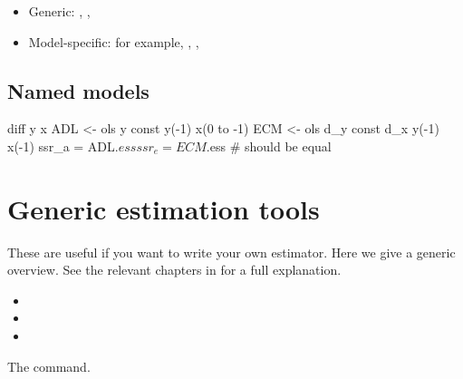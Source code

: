 \begin{itemize}
\item Generic: , , 
\item Model-specific: for example, , ,
\end{itemize}

\subsection{Named models}

\begin{code}
diff y x
ADL <- ols y const y(-1) x(0 to -1)
ECM <- ols d_y const d_x y(-1) x(-1)
ssr_a = ADL.$ess
ssr_e = ECM.$ess # should be equal
\end{code}

\section{Generic estimation tools}
\label{sec:est-blocks}

These are useful if you want to write your own estimator. Here we give
a generic overview. See the relevant chapters in \GUG{} for a full explanation.

\begin{itemize}
\item {}
\item {}
\item {}
\end{itemize}

The  command.

